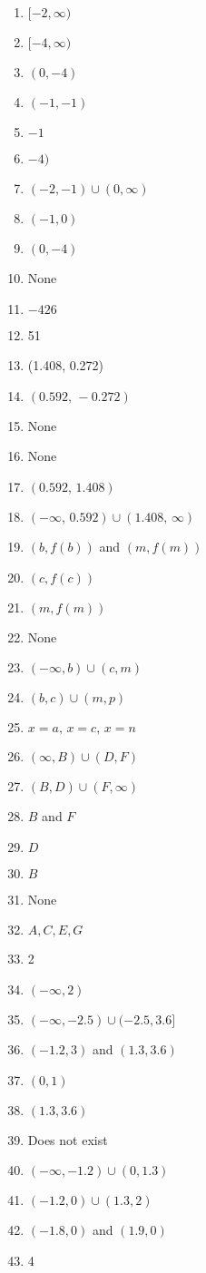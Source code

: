 \begin{multicols}{4}
\begin{enumerate}
    \item $[-2, \infty)$
    \item $[-4, \infty)$
    \item $(0, -4)$
    \item $(-1,-1)$
    \item $-1$
    \item $-4)$
    \item $(-2, -1) \cup (0, \infty)$
    \item $(-1,0)$
    \item $(0,-4)$
    \item None
    \item $-426$
    \item 51
    \item (1.408, 0.272)
    \item $(0.592, \, -0.272)$
    \item None
    \item None
    \item $(0.592, \, 1.408)$
    \item $(-\infty, \, 0.592) \cup (1.408, \, \infty)$
	\item $(b, f(b))$ and $(m, f(m))$
	\item $(c, f(c))$
	\item $(m, f(m))$
	\item None
	\item $(-\infty, b) \cup (c, m)$
	\item $(b, c) \cup (m, p)$
	\item $x = a, \, x = c, \, x = n$
    \item $(\infty, B) \cup (D, F)$
    \item $(B, D) \cup (F, \infty)$
    \item $B$ and $F$
    \item $D$
    \item $B$
    \item None
    \item $A, C, E, G$
    \item 2
    \item $(-\infty, 2)$
	\item $(-\infty, -2.5) \cup (-2.5,3.6]$
	\item $(-1.2,3)$ and $(1.3,3.6)$
	\item $(0,1)$
	\item $(1.3,3.6)$
	\item Does not exist
	\item $(-\infty, -1.2) \cup (0,1.3)$
	\item $(-1.2, 0) \cup (1.3,2)$
	\item $(-1.8,0)$ and $(1.9,0)$
	\item 4
\end{enumerate}
\end{multicols}